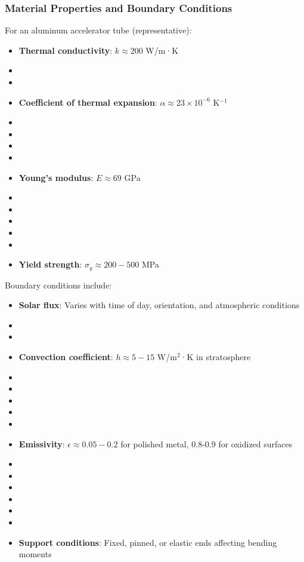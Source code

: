 {{{{\subsubsection{Material Properties and Boundary Conditions}
For an aluminum accelerator tube (representative):
\begin{itemize}
    \item \textbf{Thermal conductivity}: $k \approx 200$ W/m·K
    \item \item \item \textbf{Coefficient of thermal expansion}: $\alpha \approx 23 \times 10^{-6}$ K$^{-1}$
    \item \item \item \item \item \textbf{Young's modulus}: $E \approx 69$ GPa
    \item \item \item \item \item \item \textbf{Yield strength}: $\sigma_y \approx 200-500$ MPa
\end{itemize}
Boundary conditions include:
\begin{itemize}
    \item \textbf{Solar flux}: Varies with time of day, orientation, and atmospheric conditions
    \item \item \item \textbf{Convection coefficient}: $h \approx 5-15$ W/m$^2$·K in stratosphere
    \item \item \item \item \item \item \textbf{Emissivity}: $\epsilon \approx 0.05-0.2$ for polished metal, 0.8-0.9 for oxidized surfaces
    \item \item \item \item \item \item \item \textbf{Support conditions}: Fixed, pinned, or elastic ends affecting bending moments
\end{itemize}

}}}}
